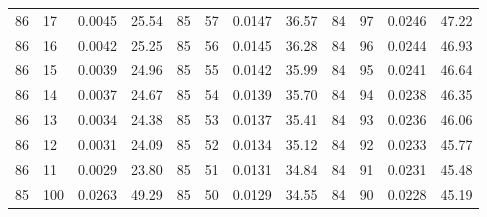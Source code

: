 \begin{tabular}{llll|llll|llll}
86 & 17 & 0.0045 & 25.54 & 85 & 57 & 0.0147 & 36.57 & 84 & 97 & 0.0246 & 47.22\\
86 & 16 & 0.0042 & 25.25 & 85 & 56 & 0.0145 & 36.28 & 84 & 96 & 0.0244 & 46.93\\
86 & 15 & 0.0039 & 24.96 & 85 & 55 & 0.0142 & 35.99 & 84 & 95 & 0.0241 & 46.64\\
86 & 14 & 0.0037 & 24.67 & 85 & 54 & 0.0139 & 35.70 & 84 & 94 & 0.0238 & 46.35\\
86 & 13 & 0.0034 & 24.38 & 85 & 53 & 0.0137 & 35.41 & 84 & 93 & 0.0236 & 46.06\\
86 & 12 & 0.0031 & 24.09 & 85 & 52 & 0.0134 & 35.12 & 84 & 92 & 0.0233 & 45.77\\
86 & 11 & 0.0029 & 23.80 & 85 & 51 & 0.0131 & 34.84 & 84 & 91 & 0.0231 & 45.48\\
85 & 100 & 0.0263 & 49.29 & 85 & 50 & 0.0129 & 34.55 & 84 & 90 & 0.0228 & 45.19\\
\bottomrule
\end{tabular}
\newpage
